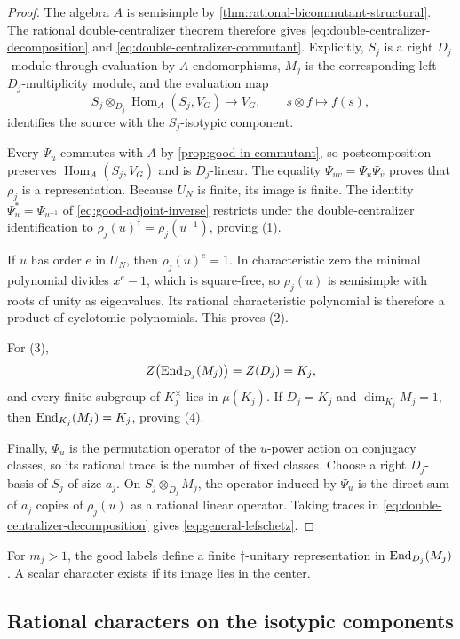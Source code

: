 \begin{proof}
The algebra \(A\) is semisimple by
\cref{thm:rational-bicommutant-structural}.  The rational
double-centralizer theorem therefore gives
\eqref{eq:double-centralizer-decomposition} and
\eqref{eq:double-centralizer-commutant}.  Explicitly, \(S_j\) is a right
\(D_j\)-module through evaluation by \(A\)-endomorphisms, \(M_j\) is the
corresponding left \(D_j\)-multiplicity module, and the evaluation map
\[
 S_j\otimes_{D_j}\operatorname{Hom}_A(S_j,V_G)\longrightarrow V_G,\qquad
 s\otimes f\longmapsto f(s),
\]
identifies the source with the \(S_j\)-isotypic component.

Every \(\Psi_u\) commutes with \(A\) by \cref{prop:good-in-commutant}, so
postcomposition preserves \(\operatorname{Hom}_A(S_j,V_G)\) and is
\(D_j\)-linear.  The equality \(\Psi_{uv}=\Psi_u\Psi_v\) proves that
\(\rho_j\) is a representation.  Because \(U_N\) is finite, its image is
finite.  The identity \(\Psi_u^*=\Psi_{u^{-1}}\) of
\eqref{eq:good-adjoint-inverse} restricts under the double-centralizer
identification to \(\rho_j(u)^\dagger=\rho_j(u^{-1})\), proving (1).

If \(u\) has order \(e\) in \(U_N\), then \(\rho_j(u)^e=1\).  In
characteristic zero the minimal polynomial divides \(x^e-1\), which is
square-free, so \(\rho_j(u)\) is semisimple with roots of unity as
eigenvalues.  Its rational characteristic polynomial is therefore a product
of cyclotomic polynomials.  This proves (2).

For (3),
\[
 Z\bigl(\operatorname{End}_{D_j}(M_j)\bigr)=Z(D_j)=K_j,
\]
and every finite subgroup of \(K_j^\times\) lies in \(\mu(K_j)\).  If
\(D_j=K_j\) and \(\dim_{K_j}M_j=1\), then
\(\operatorname{End}_{K_j}(M_j)=K_j\), proving (4).

Finally, \(\Psi_u\) is the permutation operator of the \(u\)-power action
on conjugacy classes, so its rational trace is the number of fixed classes.
Choose a right \(D_j\)-basis of \(S_j\) of size \(a_j\).  On
\(S_j\otimes_{D_j}M_j\), the operator induced by \(\Psi_u\) is the direct
sum of \(a_j\) copies of \(\rho_j(u)\) as a rational linear operator.
Taking traces in \eqref{eq:double-centralizer-decomposition} gives
\eqref{eq:general-lefschetz}.
\end{proof}

For \(m_j>1\), the good labels define a finite \(\dagger\)-unitary
representation in \(\operatorname{End}_{D_j}(M_j)\).  A scalar character exists if its
image lies in the center.

\subsection{Rational characters on the isotypic components}

